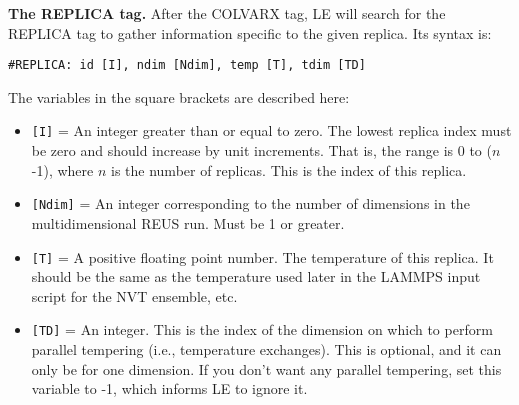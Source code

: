 \documentclass[10pt]{article}
\begin{document}
\textbf{The REPLICA tag.}
After the COLVARX tag, LE will search for the REPLICA tag to gather information specific
to the given replica. Its syntax is:
\begin{verbatim}
#REPLICA: id [I], ndim [Ndim], temp [T], tdim [TD]
\end{verbatim}
The variables in the square brackets are described here:
\begin{itemize}
\item	\texttt{[I]} = An integer greater than or equal to zero. The lowest
		replica index must be zero and should increase by unit increments. That is,
		the range is 0 to ($n$-1), where $n$ is the number of replicas. This is
		the index of this replica.
\item	\texttt{[Ndim]} = An integer corresponding to the number of dimensions
		in the multidimensional REUS run. Must be 1 or greater.
\item	\texttt{[T]} = A positive floating point number. The temperature of this replica.
		It should be the same as the temperature used later in the LAMMPS input script
		for the NVT ensemble, etc.
\item	\texttt{[TD]} = An integer. This is the index of the dimension on which to perform
		parallel tempering (i.e., temperature exchanges). This is optional, and it can only be
		for one dimension. If you don't want any parallel tempering, set this variable to -1,
		which informs LE to ignore it.
\end{itemize}
\end{document}
